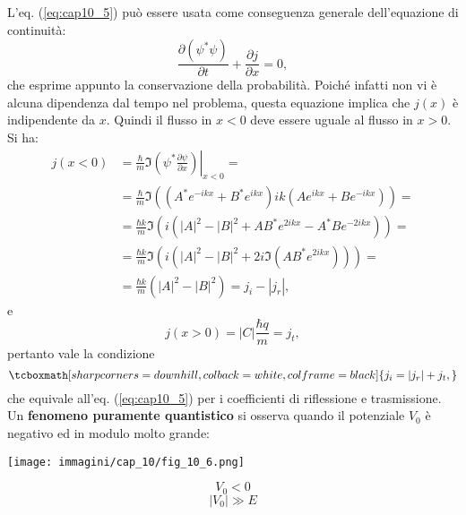 \documentclass[a4paper,12pt,oneside]{book}
\begin{document}
L'eq. (\ref{eq:cap10_5}) può essere usata come conseguenza generale dell'equazione di continuità:
	\begin{equation}
		\frac{\partial \left(\psi^* \psi \right)}{\partial t}+ \frac{\partial j}{\partial x}=0,
	\end{equation}
che esprime appunto la conservazione della probabilità. Poiché infatti non vi è alcuna dipendenza dal tempo nel problema, questa equazione implica che $j(x)$ è indipendente da $x$. Quindi il flusso in $x<0$ deve essere uguale al flusso in $x>0$. Si ha:
	\begin{align}
		j\left( x<0 \right) &= \frac{\hbar}{m} \Im \left. \left( \psi ^* \frac{\partial \psi}{\partial x} \right) \right| _{x<0} = \nonumber \\
		&= \frac{\hbar}{m} \Im \left( \left( A^* e^{-ikx} + B^* e^{ikx}\right)ik \left( A e^{ikx} + B e^{-ikx}\right)\right)= \nonumber \\
		&=\frac{\hbar k}{m} \Im \left( i\left( |A|^2 - |B|^2 +AB^* e^{2ikx}- A^* B e^{-2ikx}\right)\right)= \nonumber \\
		&=\frac{\hbar k}{m} \Im \left( i\left( |A|^2 - |B|^2 +2i \Im \left( A B^* e^{2ikx}\right) \right)\right)= \nonumber \\
		&= \frac{\hbar k}{m}\left( |A|^2 - |B|^2\right)= j_i- |j_r|,
\end{align}
e
	\begin{equation}
		j\left( x>0 \right) = |C| \frac{\hbar q}{m}= j_t,
	\end{equation}
pertanto vale la condizione
	\begin{equation}
		\tcboxmath[sharp corners=downhill, colback=white, colframe=black]{
			j_i = |j_r|+ j_t,
			}
	\end{equation}
che equivale all'eq. (\ref{eq:cap10_5}) per i coefficienti di riflessione e trasmissione.\\

Un \textbf{fenomeno puramente quantistico} si osserva quando il potenziale $V_0$ è negativo ed in modulo molto grande:\\
\begin{minipage}{.7\textwidth}
\texttt{[image: immagini/cap\_10/fig\_10\_6.png]}
\end{minipage}
\hspace{.5cm}
\begin{minipage}{.1\textwidth}
\[V_0<0\]
\[|V_0| \gg E\]
\end{minipage}\\ \\
\end{document}
